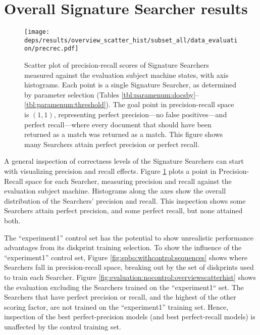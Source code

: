 \documentclass[11pt]{ucthesis}
\theoremstyle{plain}
\theoremstyle{definition}
\begin{document}
\section{Overall Signature Searcher results}

\begin{figure}
\begin{center}
\texttt{[image: deps/results/overview\_scatter\_hist/subset\_all/data\_evaluation/precrec.pdf]}
\caption{\label{fig:evaluation:withcontrol:overviewscatterhist}Scatter plot of precision-recall scores of Signature Searchers measured against the evaluation subject machine states, with axis histograms.  Each point is a single Signature Searcher, as determined by parameter selection (Tables \ref{tbl:paramenum:docsby}--\ref{tbl:paramenum:threshold}).  The goal point in precision-recall space is $(1, 1)$, representing perfect precision---no false positives---and perfect recall---where every document that should have been returned as a match was returned as a match.  This figure shows many Searchers attain perfect precision or perfect recall.}
\end{center}
\end{figure}

A general inspection of correctness levels of the Signature Searchers can start with visualizing precision and recall effects.  Figure \ref{fig:evaluation:withcontrol:overviewscatterhist} plots a point in Precision-Recall space \cite{davis:icml06} for each Searcher, measuring precision and recall against the evaluation subject machine.  Histograms along the axes show the overall distribution of the Searchers' precision and recall.  This inspection shows some Searchers attain perfect precision, and some perfect recall, but none attained both.

The ``experiment1'' control set has the potential to show unrealistic performance advantages from its diskprint training selection.  To show the influence of the ``experiment1'' control set, Figure \ref{fig:spbo:withcontrol:sequences} shows where Searchers fall in precision-recall space, breaking out by the set of diskprints used to train each Searcher.  Figure \ref{fig:evaluation:nocontrol:overviewscatterhist} shows the evaluation excluding the Searchers trained on the ``experiment1`` set.  The Searchers that have perfect precision or recall, and the highest of the other scoring factor, are not trained on the ``experiment1'' training set.  Hence, inspection of the best perfect-precision models (and best perfect-recall models) is unaffected by the control training set.
\end{document}
